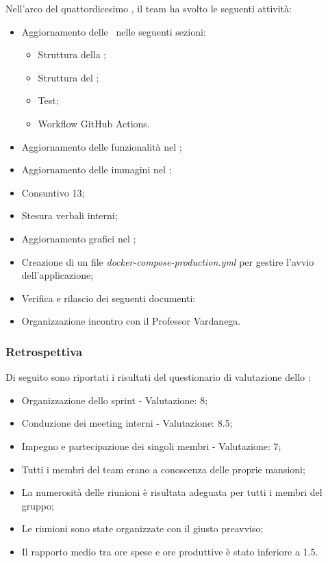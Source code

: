 Nell'arco del quattordicesimo , il team ha svolto le seguenti attività:
\begin{itemize}
  \item Aggiornamento delle \NdP\ nelle seguenti sezioni:
  \begin{itemize}
    \item Struttura della \ST;
    \item Struttura del \MU;
    \item Test;
    \item Workflow GitHub Actions.
  \end{itemize}
  \item Aggiornamento delle funzionalità nel \MU;
  \item Aggiornamento delle immagini nel \MU;
  \item Consuntivo  13;
  \item Stesura verbali interni;
  \item Aggiornamento grafici nel \PdQ;
  \item Creazione di un file \textit{docker-compose-production.yml} per gestire l'avvio dell'applicazione;
  \item Verifica e rilascio dei seguenti documenti:
  \item Organizzazione incontro con il Professor Vardanega.
\end{itemize}

\subsubsection{Retrospettiva}

\par Di seguito sono riportati i risultati del questionario di valutazione dello :
\begin{itemize}
  \item Organizzazione dello sprint - Valutazione: 8;
  \item Conduzione dei meeting interni - Valutazione: 8.5;
  \item Impegno e partecipazione dei singoli membri - Valutazione: 7;
  \item Tutti i membri del team erano a conoscenza delle proprie mansioni;
  \item La numerosità delle riunioni è risultata adeguata per tutti i membri del gruppo;
  \item Le riunioni sono state organizzate con il giusto preavviso;
  \item Il rapporto medio tra ore spese e ore produttive è stato inferiore a 1.5.
\end{itemize}

